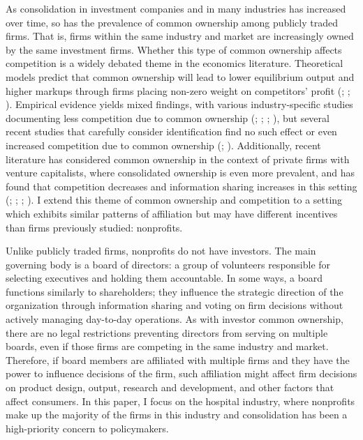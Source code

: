 \documentclass[12pt]{article}
\begin{document}
    As consolidation in investment companies and in many industries has increased over time, so has the prevalence of common ownership among publicly traded firms. That is, firms within the same industry and market are increasingly owned by the same investment firms. Whether this type of common ownership affects competition is a widely debated theme in the economics literature. Theoretical models predict that common ownership will lead to lower equilibrium output and higher markups through firms placing non-zero weight on competitors' profit (\cite{rubinstein1983competitive}; \cite{rotemberg1984financial}; \cite{azar2012new}). Empirical evidence yields mixed findings, with various industry-specific studies documenting less competition due to common ownership (\cite{he2017product}; \cite{azar2018anticompetitive}; \cite{azar2022ultimate}; \cite{newham2018common}), but several recent studies that carefully consider identification find no such effect or even increased competition due to common ownership (\cite{chen2023does}; \cite{kini2024common}). Additionally, recent literature has considered common ownership in the context of private firms with venture capitalists, where consolidated ownership is even more prevalent, and has found that competition decreases and information sharing increases in this setting (\cite{lindsey2008blurring}; \cite{gonzalez2020exchanges}; \cite{li2023common}; \cite{eldar2024common}). I extend this theme of common ownership and competition to a setting which exhibits similar patterns of affiliation but may have different incentives than firms previously studied: nonprofits. 

    Unlike publicly traded firms, nonprofits do not have investors. The main governing body is a board of directors: a group of volunteers responsible for selecting executives and holding them accountable. In some ways, a board functions similarly to shareholders; they influence the strategic direction of the organization through information sharing and voting on firm decisions without actively managing day-to-day operations. As with investor common ownership, there are no legal restrictions preventing directors from serving on multiple boards, even if those firms are competing in the same industry and market. Therefore, if board members are affiliated with multiple firms and they have the power to influence decisions of the firm, such affiliation might affect firm decisions on product design, output, research and development, and other factors that affect consumers. In this paper, I focus on the hospital industry, where nonprofits make up the majority of the firms in this industry and consolidation has been a high-priority concern to policymakers. 
    
\end{document}
